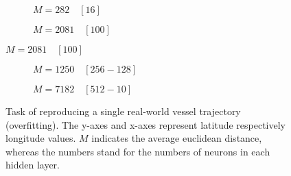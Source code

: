 \begin{figure}[H]\ContinuedFloat
     \begin{subfigure}[b]{0.48\textwidth}
         \centering
             
         \caption{$M=282 \quad [16]$}
         \label{fig:single3}
     \end{subfigure}
          \hfill
     \begin{subfigure}[b]{0.48\textwidth}
         \centering
             
         \caption{$M=2081 \quad [100]$}
     \end{subfigure}
\end{figure}
\begin{figure}[H]\ContinuedFloat
         \begin{subfigure}[b]{0.48\textwidth}
         \centering
             
         \caption{$M=1250 \quad [256-128]$}
         \label{fig:single5}
     \end{subfigure}
          \hfill
     \begin{subfigure}[b]{0.48\textwidth}
         \centering
             
         \caption{$M=7182 \quad [512-10]$}
     \end{subfigure}
     \caption{Task of reproducing a single real-world vessel trajectory (overfitting). The y-axes and x-axes represent latitude respectively longitude values. $M$ indicates the average euclidean distance, whereas the numbers stand for the numbers of neurons in each hidden layer.}
     \label{fig:singleTrack}
\end{figure}

